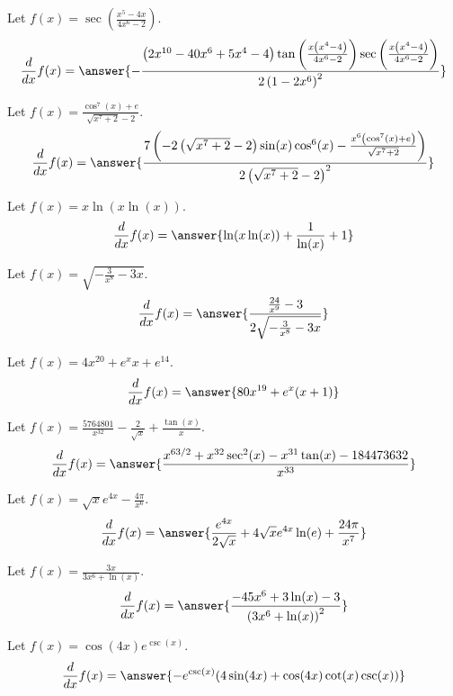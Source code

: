 \documentclass{ximera}
\begin{document}
\begin{shuffle}
\begin{exercise}
Let $f(x)=\sec \left(\frac{x^5-4 x}{4 x^6-2}\right)$.
\[
\ddx f(x) = \answer{-\frac{\left(2 x^{10}-40 x^6+5 x^4-4\right) \tan \left(\frac{x \left(x^4-4\right)}{4 x^6-2}\right) \sec \left(\frac{x \left(x^4-4\right)}{4 x^6-2}\right)}{2 \left(1-2 x^6\right)^2}}
\]
\end{exercise}

\begin{exercise}
Let $f(x)=\frac{\cos ^7(x)+e}{\sqrt{x^7+2}-2}$.
\[
\ddx f(x) = \answer{\frac{7 \left(-2 \left(\sqrt{x^7+2}-2\right) \sin (x) \cos ^6(x)-\frac{x^6 \left(\cos ^7(x)+e\right)}{\sqrt{x^7+2}}\right)}{2 \left(\sqrt{x^7+2}-2\right)^2}}
\]
\end{exercise}

\begin{exercise}
Let $f(x)=x \ln (x \ln (x))$.
\[
\ddx f(x) = \answer{\ln (x \ln (x))+\frac{1}{\ln (x)}+1}
\]
\end{exercise}

\begin{exercise}
Let $f(x)=\sqrt{-\frac{3}{x^8}-3 x}$.
\[
\ddx f(x) = \answer{\frac{\frac{24}{x^9}-3}{2 \sqrt{-\frac{3}{x^8}-3 x}}}
\]
\end{exercise}

\begin{exercise}
Let $f(x)=4 x^{20}+e^x x+e^{14}$.
\[
\ddx f(x) = \answer{80 x^{19}+e^x (x+1)}
\]
\end{exercise}

\begin{exercise}
Let $f(x)=\frac{5764801}{x^{32}}-\frac{2}{\sqrt{x}}+\frac{\tan (x)}{x}$.
\[
\ddx f(x) = \answer{\frac{x^{63/2}+x^{32} \sec ^2(x)-x^{31} \tan (x)-184473632}{x^{33}}}
\]
\end{exercise}

\begin{exercise}
Let $f(x)=\sqrt{x} e^{4 x}-\frac{4 \pi }{x^6}$.
\[
\ddx f(x) = \answer{\frac{e^{4 x}}{2 \sqrt{x}}+4 \sqrt{x} e^{4 x} \ln (e)+\frac{24 \pi }{x^7}}
\]
\end{exercise}

\begin{exercise}
Let $f(x)=\frac{3 x}{3 x^6+\ln (x)}$.
\[
\ddx f(x) = \answer{\frac{-45 x^6+3 \ln (x)-3}{\left(3 x^6+\ln (x)\right)^2}}
\]
\end{exercise}

\begin{exercise}
Let $f(x)=\cos (4 x) e^{\csc (x)}$.
\[
\ddx f(x) = \answer{-e^{\csc (x)} (4 \sin (4 x)+\cos (4 x) \cot (x) \csc (x))}
\]
\end{exercise}


\end{shuffle}
\end{document}
